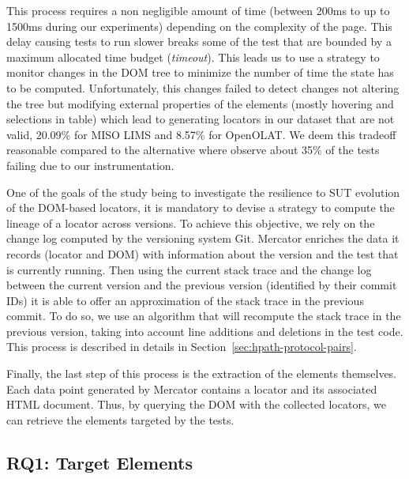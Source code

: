 This process requires a non negligible amount of time (between 200ms to up to 1500ms during our experiments) depending on the complexity of the page. This delay causing tests to run slower breaks some of the test that are bounded by a maximum allocated time budget (\emph{timeout}). This leads us to use a strategy to monitor changes in the DOM tree to minimize the number of time the state has to be computed. Unfortunately, this changes failed to detect changes not altering the tree but modifying external properties of the elements (mostly hovering and selections in table) which lead to generating locators in our dataset that are not valid, 20.09\% for MISO LIMS and 8.57\% for OpenOLAT. We deem this tradeoff reasonable compared to the alternative where observe about 35\% of the tests failing due to our instrumentation.

One of the goals of the study being to investigate the resilience to SUT evolution of the DOM-based locators, it is mandatory to devise a strategy to compute the lineage of a locator across versions. To achieve this objective, we rely on the change log computed by the versioning system Git. Mercator enriches the data it records (locator and DOM) with information about the version and the test that is currently running. Then using the current stack trace and the change log between the current version and the previous version (identified by their commit IDs) it is able to offer an approximation of the stack trace in the previous commit. To do so, we use an algorithm that will recompute the stack trace in the previous version, taking into account line additions and deletions in the test code. This process is described in details in Section~\ref{sec:hpath-protocol-pairs}.

Finally, the last step of this process is the extraction of the elements themselves. Each data point generated by Mercator contains a locator and its associated HTML document. Thus, by querying the DOM with the collected locators, we can retrieve the elements targeted by the tests.

\subsection{RQ1: Target Elements}
\label{sec:hpath-protocol-rq1}


